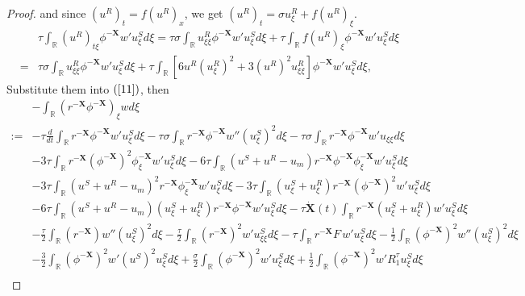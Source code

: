 \documentclass[10pt,reqno]{amsart}
\numberwithin{equation}{section}
\begin{document}
\begin{proof}
		and since $(u^R)_{t}=f(u^{R})_{x}$, we get $(u^R)_{t}=\sigma u_{\xi}^R+f(u^{R})_{\xi}.$
		\begin{align*}
			&\tau\int_{\mathbb{R}}\left(u^{R}\right)_{t\xi}\phi^{-\mathbf{X}}w'u_{\xi}^Sd\xi
			=\tau\sigma\int_{\mathbb{R}}u_{\xi\xi}^R\phi^{-\mathbf{X}}w'u_{\xi}^Sd\xi+\tau\int_{\mathbb{R}}f(u^{R})_{\xi}\phi^{-\mathbf{X}}w'u_{\xi}^Sd\xi\\
			=&\tau\sigma\int_{\mathbb{R}}u_{\xi\xi}^R\phi^{-\mathbf{X}}w'u_{\xi}^Sd\xi+\tau\int_{\mathbb{R}}\left[6u^R(u_{\xi}^R)^2+3(u^R)^2u_{\xi\xi}^R\right]\phi^{-\mathbf{X}}w'u_{\xi}^Sd\xi,
		\end{align*}
		Substitute them into $(\ref{11})$, then
		\begin{equation}\label{hhx}
			\begin{aligned}
				&-\int_{\mathbb{R}}\left(r^{-\mathbf{X}}\phi^{-\mathbf{X}}\right)_{\xi}wd\xi\\
				:=&-\tau\frac{d}{dt}\int_{\mathbb{R}}r^{-\mathbf{X}}\phi^{-\mathbf{X}}w'u_{\xi}^{S}d\xi - \tau\sigma\int_{\mathbb{R}}r^{-\mathbf{X}}\phi^{-\mathbf{X}}w''\left(u_{\xi}^{S}\right)^{2}d\xi-\tau\sigma\int_{\mathbb{R}}r^{-\mathbf{X}}\phi^{-\mathbf{X}}w'u_{\xi\xi}d\xi\\
				&-3\tau\int_{\mathbb{R}}r^{-\mathbf{X}}(\phi^{-\mathbf{X}})^{2}\phi_{\xi}^{-\mathbf{X}}w'u_{\xi}^{S}d\xi-6\tau\int_{\mathbb{R}}(u^{S}+u^{R}-u_{m})r^{-\mathbf{X}}\phi^{-\mathbf{X}}\phi_{\xi}^{-\mathbf{X}}w'u_{\xi}^{S}d\xi\\
				&-3\tau\int_{\mathbb{R}}(u^{S}+u^{R}-u_{m})^{2}r^{-\mathbf{X}}\phi_{\xi}^{-\mathbf{X}}w'u_{\xi}^{S}d\xi-3\tau\int_{\mathbb{R}}(u_{\xi}^{S}+u_{\xi}^{R})r^{-\mathbf{X}}(\phi^{-\mathbf{X}})^{2}w'u_{\xi}^{S}d\xi\\
				&-6\tau\int_{\mathbb{R}}(u^{S}+u^{R}-u_{m})(u_{\xi}^{S}+u_{\xi}^{R})r^{-\mathbf{X}}\phi^{-\mathbf{X}}w'u_{\xi}^{S}d\xi-\tau\dot{\mathbf{X}}(t)\int_{\mathbb{R}}r^{-\mathbf{X}}(u_{\xi}^{S}+u_{\xi}^{R})w'u_{\xi}^{S}d\xi\\ &-\frac{\tau}{2}\int_{\mathbb{R}}(r^{-\mathbf{X}})w''(u_{\xi}^{S})^{2}d\xi-\frac{\tau}{2}\int_{\mathbb{R}}(r^{-\mathbf{X}})^{2}w'u_{\xi\xi}^Sd\xi -\tau\int_{\mathbb{R}}r^{-\mathbf{X}}F\,w'u_{\xi}^{S}d\xi-\frac{1}{2}\int_{\mathbb{R}}(\phi^{-\mathbf{X}})^{2}w''(u_{\xi}^S)^{2}d\xi\\
				&-\frac{3}{2}\int_{\mathbb{R}}(\phi^{-\mathbf{X}})^{2}w'(u^{S})^{2}u_{\xi}^{S}d\xi+\frac{\sigma}{2}\int_{\mathbb{R}}(\phi^{-\mathbf{X}})^{2}w'u_{\xi}^{S}d\xi+\frac{1}{2}\int_{\mathbb{R}}(\phi^{-\mathbf{X}})^{2}w'R_{1}^{\tau}u_{\xi}^{S}d\xi\\

\end{aligned}
\end{equation}
\end{proof}
\end{document}
